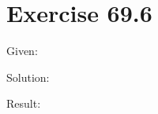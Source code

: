 \documentclass[a4paper, 10pt]{scrartcl}
\begin{document}
\section{Exercise 69.6}

Given:

Solution:

Result:
\end{document}
